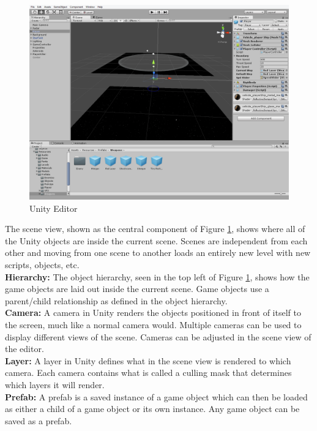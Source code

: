 \documentclass[12pt]{article}       %
\def\hs{\hspace{15pt}}
\begin{document}
\begin{figure} [H]
\centering
\includegraphics[width=7in]{scene.png}
\caption{Unity Editor} \label{Unity}
\end{figure}

\hs {\bf Scene:} The scene view, shown as the central component of Figure \ref{Unity}, shows where all of the Unity objects are inside the current scene. Scenes are independent from each other and moving from one scene to another loads an entirely new level with new scripts, objects, etc.\\

{\bf Hierarchy:} The object hierarchy, seen in the top left of Figure \ref{Unity}, shows how the game objects are laid out inside the current scene. Game objects use a parent/child relationship as defined in the object hierarchy.\\

{\bf Camera:} A camera in Unity renders the objects positioned in front of itself to the screen, much like a normal camera would. Multiple cameras can be used to display different views of the scene. Cameras can be adjusted in the scene view of the editor.\\

{\bf Layer:} A layer in Unity defines what in the scene view is rendered to which camera. Each camera contains what is called a culling mask that determines which layers it will render. \\

{\bf Prefab:} A prefab is a saved instance of a game object which can then be loaded as either a child of a game object or its own instance. Any game object can be saved as a prefab.
\end{document}
